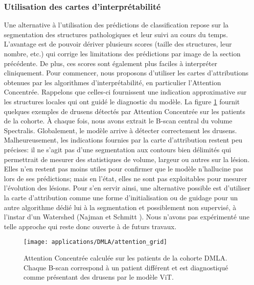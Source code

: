 \subsubsection{Utilisation des cartes d'interprétabilité}
Une alternative à l'utilisation des prédictions de classification repose sur la segmentation des structures pathologiques et leur suivi au cours du temps. L'avantage est de pouvoir dériver plusieurs scores (taille des structures, leur nombre, etc.) qui corrige les limitations des prédictions par image de la section précédente. De plus, ces scores sont également plus faciles à interpréter cliniquement.
Pour commencer, nous proposons d'utiliser les cartes d'attributions obtenues par les algorithmes d'interprétabilité, en particulier l'Attention Concentrée. Rappelons que celles-ci fournissent une indication approximative sur les structures locales qui ont guidé le diagnostic du modèle. La figure \ref{fig:DrusenDetectionWithFocusedAttention} fournit quelques exemples de drusens détectés par Attention Concentrée sur les patients de la cohorte. À chaque fois, nous avons extrait le B-scan central du volume Spectralis. Globalement, le modèle arrive à détecter correctement les drusens. Malheureusement, les indications fournies par la carte d'attribution restent peu précises: il ne s'agit pas d'une segmentation aux contours bien délimités qui permettrait de mesurer des statistiques de volume, largeur ou autres sur la lésion. Elles n'en restent pas moins utiles pour confirmer que le modèle n'hallucine pas lors de ses prédictions; mais en l'état, elles ne sont pas exploitables pour mesurer l'évolution des lésions. Pour s'en servir ainsi, une alternative possible est d'utiliser la carte d'attribution comme une forme d'initialisation ou de guidage pour un autre algorithme dédié lui à la segmentation et possiblement non supervisé, à l'instar d'un Watershed (Najman et Schmitt \cite{najmanWatershedContinuousFunction1994}). Nous n'avons pas expérimenté une telle approche qui reste donc ouverte à de futurs travaux.
\begin{figure}[!htb]
	\centering
	\texttt{[image: applications/DMLA/attention\_grid]}
	\caption{Attention Concentrée calculée sur les patients de la cohorte DMLA. Chaque B-scan correspond à un patient différent et est diagnostiqué comme présentant des drusens par le modèle ViT.}
	\label{fig:DrusenDetectionWithFocusedAttention}
\end{figure}
 
